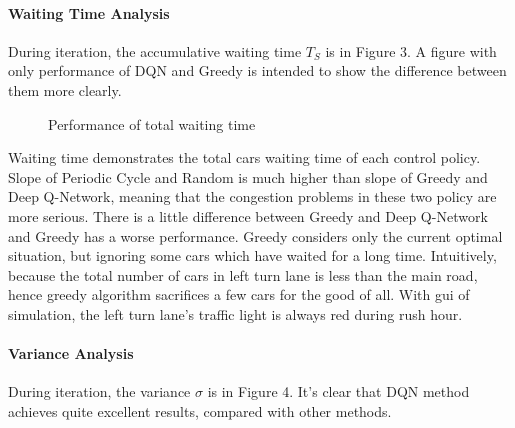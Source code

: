 \documentclass[letterpaper]{article} %
\begin{document}
\paragraph{Waiting Time Analysis} During iteration, the accumulative waiting time $T_S$ is in Figure 3. A figure with only performance of DQN and Greedy is intended to show the difference between them more clearly.
\begin{figure}[h]
	\centering
	\caption{Performance of total waiting time}
	\label{fig:waitingtime}
\end{figure}

Waiting time demonstrates the total cars waiting time of each control policy. 
Slope of Periodic Cycle and Random is much higher than slope of Greedy and Deep Q-Network, meaning that the congestion problems in these two policy are more serious. There is a little difference between Greedy and Deep Q-Network and Greedy has a worse performance. Greedy considers only the current optimal situation, but ignoring some cars which have waited for a long time. Intuitively, because the total number of cars in left turn lane is less than the main road, hence greedy algorithm sacrifices a few cars for the good of all. With gui of simulation, the left turn lane's traffic light is always red during rush hour.

\paragraph{Variance Analysis} During iteration, the variance $\sigma$ is in Figure 4. It's clear that DQN method achieves quite excellent results, compared with other methods.
\end{document}
